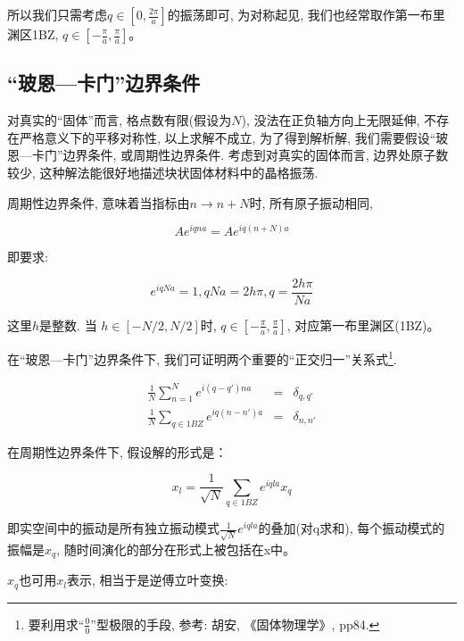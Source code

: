 所以我们只需考虑$q \in \left[0, \frac{2\pi}{a} \right]$的振荡即可, 为对称起见, 我们也经常取作第一布里渊区1BZ, $q \in
\left[-\frac{\pi}{a} , \frac{\pi}{a} \right]$。

\subsection{“玻恩---卡门”边界条件}

对真实的“固体”而言, 格点数有限(假设为$N$), 没法在正负轴方向上无限延伸, 不存在严格意义下的平移对称性,
以上求解不成立, 为了得到解析解, 我们需要假设“玻恩---卡门”边界条件, 或周期性边界条件. 考虑到对真实的固体而言, 边界处原子数较少,
这种解法能很好地描述块状固体材料中的晶格振荡.

周期性边界条件, 意味着当指标由$n \to n+N$时, 所有原子振动相同,

\begin{equation*}
A e^{i q n a} = A e^{i q (n +N) a}
\end{equation*}

即要求:

\begin{equation*}
e^{i q N a} =1, qNa = 2h \pi, q = \frac{2 h \pi}{Na}
\end{equation*}

这里$h$是整数. 当 $h \in [-N/2, N/2]$时, $q  \in [-\frac{\pi}{a},
\frac{\pi}{a}]$, 对应第一布里渊区(1BZ)。

在“玻恩---卡门”边界条件下, 我们可证明两个重要的“正交归一”关系式\footnote{要利用求“$\frac{0}{0}$”型极限的手段,
参考: 胡安, 《固体物理学》, pp84.}.

\begin{eqnarray*}
  \frac{1}{N} \sum_{n=1}^N e^{i (q-q')na} &=& \delta_{q,q'} \\
  \frac{1}{N} \sum_{q \in 1BZ} e^{i q (n-n')a} &=& \delta_{n,n'}
\end{eqnarray*}

在周期性边界条件下, 假设解的形式是：

\begin{equation}\label{x_l lattice wave}
x_l = \frac{1}{\sqrt N} \sum_{q \in 1BZ} e^{iq l a} x_q
\end{equation}

即实空间中的振动是所有独立振动模式$\frac{1}{\sqrt N}e^{iq l a}$的叠加(对q求和), 每个振动模式的振幅是$x_q$,
随时间演化的部分在形式上被包括在x中。

$x_q$也可用$x_l$表示, 相当于是逆傅立叶变换:

